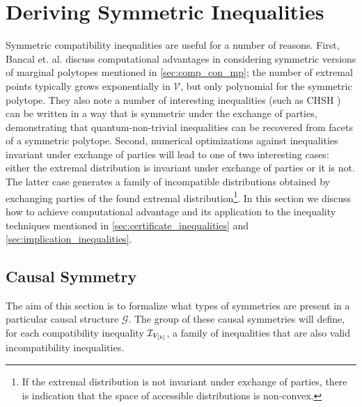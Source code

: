 \documentclass[aps, 10pt, english, twoside, pra, nofootinbib, longbibliography]{revtex4-1}
\theoremstyle{plain}
\theoremstyle{definition}
\theoremstyle{remark}
\newcommand{\graph}{\mathcal{G}}
\begin{document}
    \section{Deriving Symmetric Inequalities}
    Symmetric compatibility inequalities are useful for a number of reasons. First, Bancal et. al. \cite{Bancal_2010} discuss computational advantages in considering symmetric versions of marginal polytopes mentioned in \cref{sec:comp_con_mp}; the number of extremal points typically grows exponentially in $\mathcal{V}$, but only polynomial for the symmetric polytope. They also note a number of interesting inequalities (such as CHSH \cite{CHSH_Original}) can be written in a way that is symmetric under the exchange of parties, demonstrating that quantum-non-trivial inequalities can be recovered from facets of a symmetric polytope. Second, numerical optimizations against inequalities invariant under exchange of parties will lead to one of two interesting cases: either the extremal distribution is invariant under exchange of parties or it is not. The latter case generates a family of incompatible distributions obtained by exchanging parties of the found extremal distribution\footnote{If the extremal distribution is not invariant under exchange of parties, there is indication that the space of accessible distributions is non-convex.}. In this section we discuss how to achieve computational advantage and its application to the inequality techniques mentioned in \cref{sec:certificate_inequalities} and \cref{sec:implication_inequalities}.
    \subsection{Causal Symmetry}
    The aim of this section is to formalize what types of symmetries are present in a particular causal structure $\graph$. The group of these causal symmetries will define, for each compatibility inequality $\mathcal{I}_{V_{\left[ k \right]}}$, a family of inequalities that are also valid incompatibility inequalities.
\end{document}
